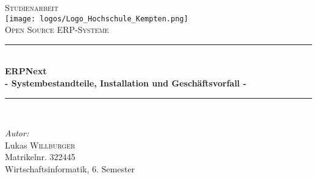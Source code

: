 \documentclass[
  fontsize=12pt, %
  a4paper,  %
  oneside,  %
  bibliography=totoc,
  headsepline,
  cleardoublepage=empty,
  parskip=half,
  draft=false
]{scrbook}
\begin{document}
\begin{titlepage}

\newcommand{\HRule}{\rule{\linewidth}{0.5mm}} %

\center %
 

\textsc{\LARGE Studienarbeit}\\[1.5cm] %
\texttt{[image: logos/Logo\_Hochschule\_Kempten.png]}\\[1cm] %
\textsc{\Large Open Source ERP-Systeme}\\[0.5cm] %


\HRule \\[0.4cm]
{ \huge \bfseries ERPNext \\ \Large - Systembestandteile, Installation und Geschäftsvorfall -}\\[0.4cm] %
\HRule \\[1.5cm]
 

\begin{minipage}{0.4\textwidth}

\emph{Autor:}\\
Lukas \textsc{Willburger}\\ %
Matrikelnr. 322445 \\
Wirtschaftsinformatik, 6. Semester \\ \newline 



\end{minipage}
\end{titlepage}
\end{document}
